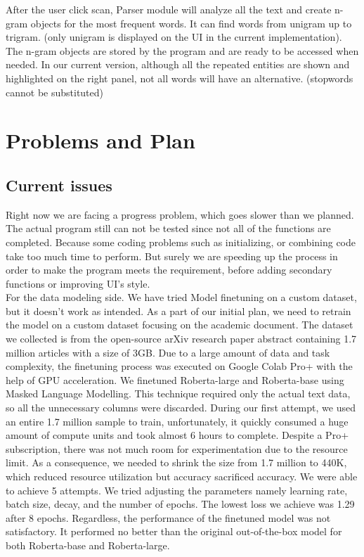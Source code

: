 \documentclass[12pt,oneside,openright,a4paper]{cpe-english-project}
\begin{document}
After the user click scan, Parser module will analyze all the text and create n-gram objects for the most frequent words. It can find words from unigram up to trigram. (only unigram is displayed on the UI in the current implementation). The n-gram objects are stored by the program and are ready to be accessed when needed. In our current version, although all the repeated entities are shown and highlighted on the right panel, not all words will have an alternative. (stopwords cannot be substituted) 

\section{Problems and Plan}
\subsection{Current issues}
Right now we are facing a progress problem, which goes slower than we planned. The actual program still can not be tested since not all of the functions are completed. Because some coding problems such as initializing, or combining code take too much time to perform. But surely we are speeding up the process in order to make the program meets the requirement, before adding secondary functions or improving UI’s style.\\

For the data modeling side. We have tried Model finetuning on a custom dataset, but it doesn’t work as intended. As a part of our initial plan, we need to retrain the model on a custom dataset focusing on the academic document. The dataset we collected is from the open-source arXiv research paper abstract containing 1.7 million articles with a size of 3GB. Due to a large amount of data and task complexity, the finetuning process was executed on Google Colab Pro+ with the help of GPU acceleration. We finetuned Roberta-large and Roberta-base using Masked Language Modelling. This technique required only the actual text data, so all the unnecessary columns were discarded. During our first attempt, we used an entire 1.7 million sample to train, unfortunately, it quickly consumed a huge amount of compute units and took almost 6 hours to complete. Despite a Pro+ subscription, there was not much room for experimentation due to the resource limit. As a consequence, we needed to shrink the size from 1.7 million to 440K, which reduced resource utilization but accuracy sacrificed accuracy. We were able to achieve 5 attempts. We tried adjusting the parameters namely learning rate, batch size, decay, and the number of epochs. The lowest loss we achieve was 1.29 after 8 epochs. Regardless, the performance of the finetuned model was not satisfactory. It performed no better than the original out-of-the-box model for both Roberta-base and Roberta-large. \\
\end{document}
